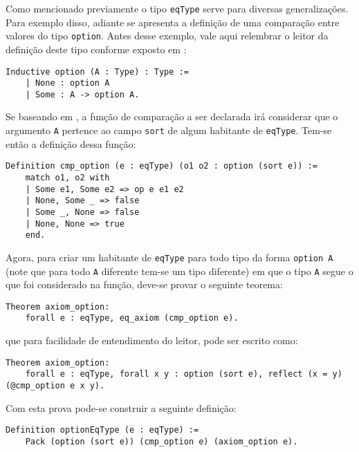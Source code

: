 Como mencionado previamente o tipo \lstinline[language = coq]$eqType$ serve para diversas generalizações. Para exemplo disso, adiante se apresenta a definição de uma comparação entre valores do tipo \lstinline[language = coq]$option$. Antes desse exemplo, vale aqui relembrar o leitor da definição deste tipo conforme exposto em \cite{coqteam2022manual}:
    \begin{lstlisting}[language = coq,frame=single,tabsize=1]
Inductive option (A : Type) : Type :=
    | None : option A
    | Some : A -> option A.
    \end{lstlisting}
Se baseando em \cite{assia_mahboubi_2022_7118596}, a função de comparação a ser declarada irá considerar que o argumento \lstinline[language = coq]$A$ pertence ao campo \lstinline[language = coq]$sort$ de algum habitante de \lstinline[language = coq]$eqType$. Tem-se então a definição dessa função:
    \begin{lstlisting}[language = coq,frame=single,tabsize=1]
Definition cmp_option (e : eqType) (o1 o2 : option (sort e)) :=
    match o1, o2 with
    | Some e1, Some e2 => op e e1 e2
    | None, Some _ => false
    | Some _, None => false
    | None, None => true
    end.
    \end{lstlisting}
Agora, para criar um habitante de \lstinline[language = coq]$eqType$ para todo tipo da forma \lstinline[language = coq]$option A$ (note que para todo \lstinline[language = coq]$A$ diferente tem-se um tipo diferente) em que o tipo \lstinline[language = coq]$A$ segue o que foi considerado na função, deve-se provar o seguinte teorema:
    \begin{lstlisting}[language = coq,frame=single,tabsize=1]
Theorem axiom_option: 
    forall e : eqType, eq_axiom (cmp_option e).
    \end{lstlisting}
que para facilidade de entendimento do leitor, pode ser escrito como:
    \begin{lstlisting}[language = coq,frame=single,tabsize=1]
Theorem axiom_option: 
    forall e : eqType, forall x y : option (sort e), reflect (x = y) (@cmp_option e x y).
    \end{lstlisting}
Com esta prova pode-se construir a seguinte definição:
    \begin{lstlisting}[language = coq,frame=single,tabsize=1]
Definition optionEqType (e : eqType) := 
    Pack (option (sort e)) (cmp_option e) (axiom_option e).
    \end{lstlisting}
